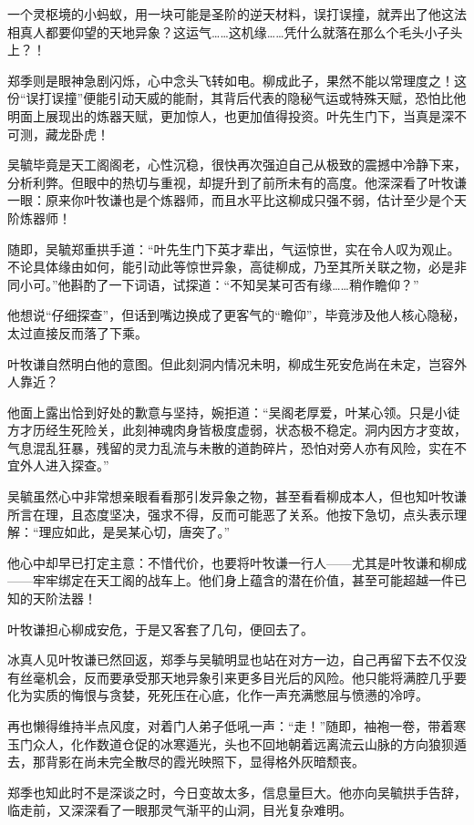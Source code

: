 一个灵枢境的小蚂蚁，用一块可能是圣阶的逆天材料，误打误撞，就弄出了他这法相真人都要仰望的天地异象？这运气……这机缘……凭什么就落在那么个毛头小子头上？！

郑季则是眼神急剧闪烁，心中念头飞转如电。柳成此子，果然不能以常理度之！这份“误打误撞”便能引动天威的能耐，其背后代表的隐秘气运或特殊天赋，恐怕比他明面上展现出的炼器天赋，更加惊人，也更加值得投资。叶先生门下，当真是深不可测，藏龙卧虎！

吴毓毕竟是天工阁阁老，心性沉稳，很快再次强迫自己从极致的震撼中冷静下来，分析利弊。但眼中的热切与重视，却提升到了前所未有的高度。他深深看了叶牧谦一眼：原来你叶牧谦也是个炼器师，而且水平比这柳成只强不弱，估计至少是个天阶炼器师！

随即，吴毓郑重拱手道：“叶先生门下英才辈出，气运惊世，实在令人叹为观止。不论具体缘由如何，能引动此等惊世异象，高徒柳成，乃至其所关联之物，必是非同小可。”他斟酌了一下词语，试探道：“不知吴某可否有缘……稍作瞻仰？”

他想说“仔细探查”，但话到嘴边换成了更客气的“瞻仰”，毕竟涉及他人核心隐秘，太过直接反而落了下乘。

叶牧谦自然明白他的意图。但此刻洞内情况未明，柳成生死安危尚在未定，岂容外人靠近？

他面上露出恰到好处的歉意与坚持，婉拒道：“吴阁老厚爱，叶某心领。只是小徒方才历经生死险关，此刻神魂肉身皆极度虚弱，状态极不稳定。洞内因方才变故，气息混乱狂暴，残留的灵力乱流与未散的道韵碎片，恐怕对旁人亦有风险，实在不宜外人进入探查。”

吴毓虽然心中非常想亲眼看看那引发异象之物，甚至看看柳成本人，但也知叶牧谦所言在理，且态度坚决，强求不得，反而可能恶了关系。他按下急切，点头表示理解：“理应如此，是吴某心切，唐突了。”

他心中却早已打定主意：不惜代价，也要将叶牧谦一行人——尤其是叶牧谦和柳成——牢牢绑定在天工阁的战车上。他们身上蕴含的潜在价值，甚至可能超越一件已知的天阶法器！

叶牧谦担心柳成安危，于是又客套了几句，便回去了。

冰真人见叶牧谦已然回返，郑季与吴毓明显也站在对方一边，自己再留下去不仅没有丝毫机会，反而要承受那天地异象引来更多目光后的风险。他只能将满腔几乎要化为实质的悔恨与贪婪，死死压在心底，化作一声充满憋屈与愤懑的冷哼。

再也懒得维持半点风度，对着门人弟子低吼一声：“走！”随即，袖袍一卷，带着寒玉门众人，化作数道仓促的冰寒遁光，头也不回地朝着远离流云山脉的方向狼狈遁去，那背影在尚未完全散尽的霞光映照下，显得格外灰暗颓丧。

郑季也知此时不是深谈之时，今日变故太多，信息量巨大。他亦向吴毓拱手告辞，临走前，又深深看了一眼那灵气渐平的山洞，目光复杂难明。

